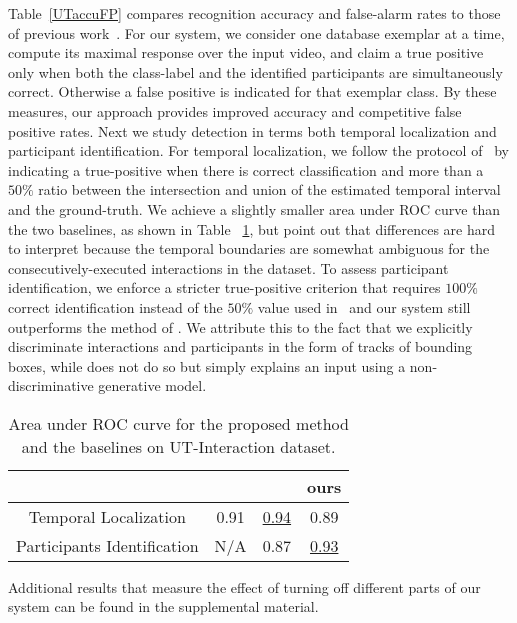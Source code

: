 Table~\ref{UTaccuFP} compares recognition accuracy and false-alarm rates to those of previous work~\cite{Ryoo:group,Amer:group}. For our system, we consider one database exemplar at a time, compute its maximal response over the input video, and claim a true positive only when both the class-label and the identified participants are simultaneously correct. Otherwise a false positive is indicated for that exemplar class. By these measures, our approach provides improved accuracy and competitive false positive rates. Next we study detection in terms both temporal localization and participant identification. For temporal localization, we follow the protocol of~\cite{Amer:group} by indicating a true-positive when there is correct classification and more than a $50\%$ ratio between the intersection and union of the estimated temporal interval and the ground-truth. We achieve a slightly smaller area under ROC curve than the two baselines, as shown in Table ~\ref{UTarea}, but point out that differences are hard to interpret because the temporal boundaries are somewhat ambiguous for the consecutively-executed interactions in the dataset. To assess participant identification, we enforce a stricter true-positive criterion that requires $100\%$ correct identification instead of the $50\%$ value used in~\cite{Amer:group} and our system still outperforms the method of \cite{Amer:group}. We attribute this to the fact that we explicitly discriminate interactions and participants in the form of tracks of bounding boxes, while \cite{Amer:group} does not do so but simply explains an input using a non-discriminative generative model.

\begin{table}[ht]
\vspace{-5pt}
\centering \caption{Area under ROC curve for the proposed method and the baselines on UT-Interaction dataset.}
\footnotesize{
\begin{tabular}{|c|c|c|c|}
\hline   & \cite{Ryoo:group} &  \cite{Amer:group}  &   ours \\
\hline Temporal Localization &  0.91 & \underline{0.94} &  0.89\\
\hline Participants Identification &  N/A & 0.87 &  \underline{0.93}   \\
\hline 
\end{tabular}
}
\label{UTarea}
\vspace{-5pt}
\end{table}

Additional results that measure the effect of turning off different parts of our system can be found in the supplemental material.


